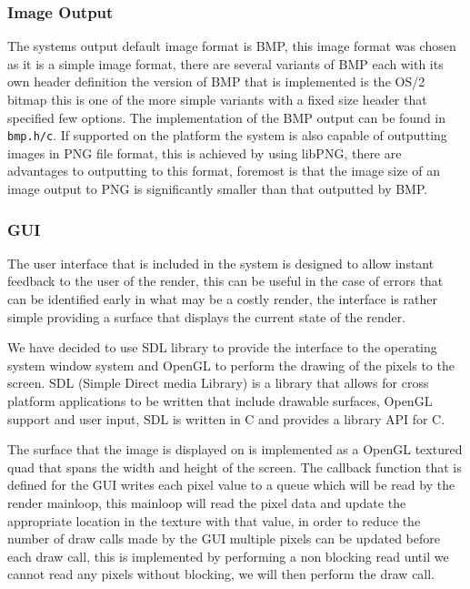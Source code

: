 \subsubsection{Image Output}

The systems output default image format is BMP, this image format was chosen as it is a simple image format, there are
several variants of BMP each with its own header definition the version of BMP that is implemented is the OS/2 bitmap this is
one of the more simple variants with a fixed size header that specified few options. The implementation of the BMP output can
be found in \texttt{bmp.h/c}. If supported on the platform the system is also capable of outputting images in PNG file format,
this is achieved by using libPNG, there are advantages to outputting to this format, foremost is that the image size of an
image output to PNG is significantly smaller than that outputted by BMP.

\subsubsection{GUI}

The user interface that is included in the system is designed to allow instant feedback to the user of the render, this can be
useful in the case of errors that can be identified early in what may be a costly render, the interface is rather simple
providing a surface that displays the current state of the render.

We have decided to use SDL library to provide the interface to the operating system window system and OpenGL to perform the 
drawing of the pixels to the screen. SDL (Simple Direct media Library) is a library that allows for cross platform applications to be written that include
drawable surfaces, OpenGL support and user input, SDL is written in C and provides a library API for C.

The surface that the image is displayed on is implemented as a OpenGL textured quad that spans the width and height of the screen.
The callback function that is defined for the GUI writes each pixel value to a queue which will be read by the render mainloop,
this mainloop will read the pixel data and update the appropriate location in the texture with that value, in order to reduce the
number of draw calls made by the GUI multiple pixels can be updated before each draw call, this is implemented by performing
a non blocking read until we cannot read any pixels without blocking, we will then perform the draw call.


